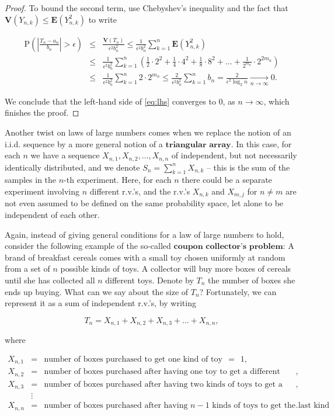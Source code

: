\begin{proof}
\noindent To bound the second term, use Chebyshev's inequality
and the fact that
$\mathbf{V}(Y_{n,k})\le \mathbf{E}(Y_{n,k}^2)$ to
write

\begin{eqnarray*}
\mathrm{P}\left( \left|\frac{T_n-a_n}{b_n}\right| > \epsilon\right) &\le& \frac{\mathbf{V}(T_n)}{\epsilon^2 b_n^2}
\le \frac{1}{\epsilon^2 b_n^2} \sum_{k=1}^n \mathbf{E}(Y_{n,k}^2) \\
&\le& \frac{1}{\epsilon^2 b_n^2} \sum_{k=1}^n
\left(\frac12\cdot 2^2 + \frac14\cdot 4^2 + \frac18 \cdot 8^2 + \ldots + \frac{1}{2^{m_{n}}}\cdot 2^{2m_{n}} \right) \\
&\le&
\frac{1}{\epsilon^2 b_n^2} \sum_{k=1}^n 2\cdot 2^{m_n}
\le \frac{2}{\epsilon^2 b_n^2} \sum_{k=1}^n b_n = \frac{2}{\epsilon^2 \log_2 n} \xrightarrow[n\to\infty]{} 0.
\end{eqnarray*}

\noindent We conclude that the left-hand side of \eqref{eq:lhs}
converges to 0, as $n\to\infty$, which finishes the
proof.
\end{proof}

\noindent Another twist on laws of large numbers comes when we
replace the notion of an i.i.d. sequence by a more
general notion of a $\textbf{triangular array}$. In
this case, for each $n$ we have a sequence
$X_{n,1},X_{n,2},\ldots,X_{n,n}$ of independent, but
not necessarily identically distributed, and we denote
$S_n=\sum_{k=1}^n X_{n,k}$ -- this is the sum of the
samples in the $n$-th experiment. Here, for each $n$
there could be a separate experiment involving $n$
different r.v.'s, and the r.v.'s $X_{n,k}$ and
$X_{m,j}$ for $n\neq m$ are not even assumed to be
defined on the same probability space, let alone to be
independent of each other.

Again, instead of giving general conditions for a law
of large numbers to hold, consider the following
example of the so-called
$\textbf{coupon collector's problem}$: A brand of
breakfast cereals comes with a small toy chosen
uniformly at random from a set of $n$ possible kinds
of toys. A collector will buy more boxes of cereals
until she has collected all $n$ different toys.
Denote by $T_n$ the number of boxes she ends up
buying. What can we say about the size of $T_n$?
Fortunately, we can represent it as a sum of
independent r.v.'s, by writing

\[
T_n = X_{n,1} + X_{n,2} + X_{n,3} + \ldots + X_{n,n},
\]

\noindent where

\begin{eqnarray*}
X_{n,1} &=& \textrm{number of boxes purchased to get one kind of toy} \ \ =\ \ 1, \\
X_{n,2} &=& \textrm{number of boxes purchased after having one toy to get a different kind}, \\
X_{n,3} &=& \textrm{number of boxes purchased after having two kinds of toys to get a third kind}, \\
& \vdots&  \\
X_{n,n} &=& \textrm{number of boxes purchased after having $n-1$ kinds of toys to get the last kind}.
\end{eqnarray*}

